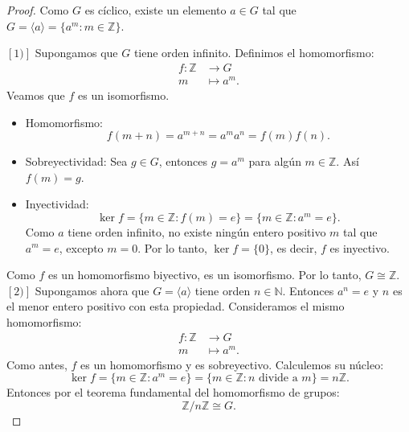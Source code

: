 \begin{proof}
	Como \( G \) es cíclico, existe un elemento \( a \in G \) tal que \( G = \langle a \rangle = \{ a^m : m \in \mathbb{Z} \} \).
	
	\medskip
	\noindent$[1)]$ Supongamos que \( G \) tiene orden infinito. Definimos el homomorfismo:
		\[
		\begin{aligned}
			f : \mathbb{Z} &\longrightarrow G \\
			m &\longmapsto a^m.
		\end{aligned}
		\]
		Veamos que \( f \) es un isomorfismo.
		\begin{itemize}
			\item Homomorfismo:
			\[
			f(m + n) = a^{m+n} = a^m a^n = f(m)f(n).
			\]
			
			\item Sobreyectividad: Sea $g\in G$, entonces \(g= a^m \) para algún \( m \in \mathbb{Z} \). Así $f(m)=g$.
			
			\item Inyectividad:
			\[
			\ker f = \{ m \in \mathbb{Z} : f(m) = e \} = \{ m \in \mathbb{Z} : a^m = e \}.
			\]
			Como \( a \) tiene orden infinito, no existe ningún entero positivo \( m \) tal que \( a^m = e \), excepto \( m = 0 \). Por lo tanto, \( \ker f = \{0\} \), es decir, \( f \) es inyectivo.
		\end{itemize}
		
		Como \( f \) es un homomorfismo biyectivo, es un isomorfismo. Por lo tanto, \( G \cong \mathbb{Z} \).\\
		
		\noindent $[2)]$ Supongamos ahora que \( G =\langle a\rangle\) tiene orden \( n \in \mathbb{N} \). Entonces \( a^n = e \) y \( n \) es el menor entero positivo con esta propiedad. Consideramos el mismo homomorfismo:
		\[
		\begin{aligned}
			f : \mathbb{Z} &\longrightarrow G \\
			m &\longmapsto a^m.
		\end{aligned}
		\]
		Como antes, \( f \) es un homomorfismo y es sobreyectivo. Calculemos su núcleo:
		\[
		\ker f = \{ m \in \mathbb{Z} : a^m = e \} = \{ m \in \mathbb{Z} : n \text{ divide a } m \} = n\mathbb{Z}.
		\]
		Entonces por el teorema fundamental del homomorfismo de grupos:
		\[ \mathbb{Z} / n\mathbb{Z} \cong G.
		\]

\end{proof}


\begin{proposicion}
\end{proposicion}

